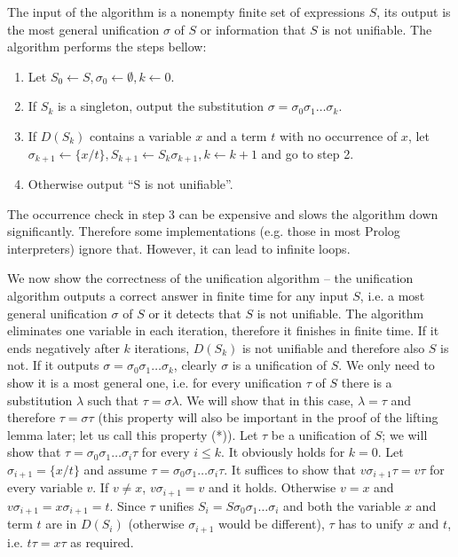The input of the algorithm is a nonempty finite set of expressions $S$, its output is the most general unification $\sigma$ of $S$ or information that $S$ is not unifiable. The algorithm performs the steps bellow:
\begin{enumerate}
	\item Let $S_0 \gets S, \sigma_0 \gets \emptyset, k \gets 0$.
	\item If $S_k$ is a singleton, output the substitution $\sigma = \sigma_0 \sigma_1 \dots \sigma_k$.
	\item If $D(S_k)$ contains a variable $x$ and a term $t$ with no occurrence of $x$, let $\sigma_{k+1} \gets \{x/t\}, S_{k+1} \gets S_k \sigma_{k+1}, k \gets k+1$ and go to step 2.
	\item Otherwise output ``S is not unifiable''.
\end{enumerate}

The occurrence check in step 3 can be expensive and slows the algorithm down significantly. Therefore some implementations (e.g. those in most Prolog interpreters) ignore that. However, it can lead to infinite loops.

We now show the correctness of the unification algorithm -- the unification algorithm outputs a correct answer in finite time for any input $S$, i.e. a most general unification $\sigma$ of $S$ or it detects that $S$ is not unifiable. The algorithm eliminates one variable in each iteration, therefore it finishes in finite time. If it ends negatively after $k$ iterations, $D(S_k)$ is not unifiable and therefore also $S$ is not. If it outputs $\sigma = \sigma_0 \sigma_1 \dots \sigma_k$, clearly $\sigma$ is a unification of $S$. We only need to show it is a most general one, i.e. for every unification $\tau$ of $S$ there is a substitution $\lambda$ such that $\tau = \sigma \lambda$. We will show that in this case, $\lambda = \tau$ and therefore $\tau = \sigma \tau$ (this property will also be important in the proof of the lifting lemma later; let us call this property (*)). Let $\tau$ be a unification of $S$; we will show that $\tau = \sigma_0 \sigma_1 \dots \sigma_i \tau$ for every $i \leq k$. It obviously holds for $k = 0$. Let $\sigma_{i+1} = \{x/t\}$ and assume $\tau = \sigma_0 \sigma_1 \dots \sigma_i \tau$. It suffices to show that $v \sigma_{i+1} \tau = v \tau$ for every variable $v$. If $v \neq x$, $v \sigma_{i+1} = v$ and it holds. Otherwise $v = x$ and $v \sigma_{i+1} = x \sigma_{i+1} = t$. Since $\tau$ unifies $S_i=S \sigma_0 \sigma_1 \dots \sigma_i$ and both the variable $x$ and term $t$ are in $D(S_i)$ (otherwise $\sigma_{i+1}$ would be different), $\tau$ has to unify $x$ and $t$, i.e. $t \tau = x \tau$ as required.

